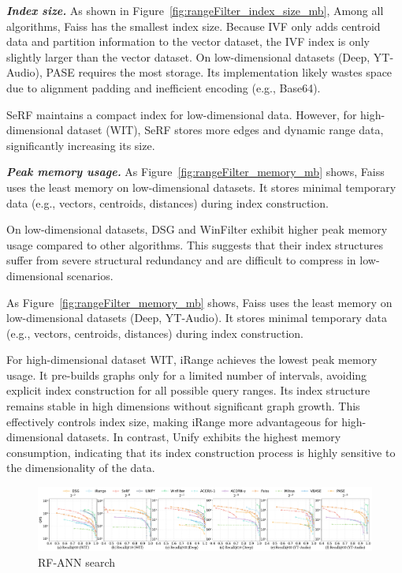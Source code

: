 \documentclass[sigconf, nonacm]{acmart}
\begin{document}
	\textit{\textbf{Index size.}} 
	As shown in Figure~\ref{fig:rangeFilter_index_size_mb}, Among all algorithms, Faiss has the smallest index size. Because IVF only adds centroid data and partition information to the vector dataset, the IVF index is only slightly larger than the vector dataset.
	On low-dimensional datasets (Deep, YT-Audio), PASE requires the most storage. Its implementation likely wastes space due to alignment padding and inefficient encoding (e.g., Base64).
	
	SeRF maintains a compact index for low-dimensional data. However, for high-dimensional dataset (WIT), SeRF stores more edges and dynamic range data, significantly increasing its size.
	
	\textit{\textbf{Peak memory usage.}}
	As Figure~\ref{fig:rangeFilter_memory_mb} shows, Faiss uses the least memory on low-dimensional datasets. It stores minimal temporary data (e.g., vectors, centroids, distances) during index construction.
	
	On low-dimensional datasets, DSG and WinFilter exhibit higher peak memory usage compared to other algorithms. This suggests that their index structures suffer from severe structural redundancy and are difficult to compress in low-dimensional scenarios.
	

	As Figure~\ref{fig:rangeFilter_memory_mb} shows, Faiss uses the least memory on low-dimensional datasets (Deep, YT-Audio). It stores minimal temporary data (e.g., vectors, centroids, distances) during index construction.
	
	For high-dimensional dataset WIT, iRange achieves the lowest peak memory usage. It pre-builds graphs only for a limited number of intervals, avoiding explicit index construction for all possible query ranges. Its index structure remains stable in high dimensions without significant graph growth. This effectively controls index size, making iRange more advantageous for high-dimensional datasets.
	In contrast, Unify exhibits the highest memory consumption, indicating that its index construction process is highly sensitive to the dimensionality of the data.

	\begin{figure}[htbp]
		\centering
		  \setlength{\abovecaptionskip}{0cm}
		    \setlength{\belowcaptionskip}{-0.5cm}
		\includegraphics[width=\textwidth]{figures/exp/exp_8_2.pdf}
		\caption{RF-ANN search }
		\label{fig:exp_8_2}
	\end{figure}
	
\end{document}
